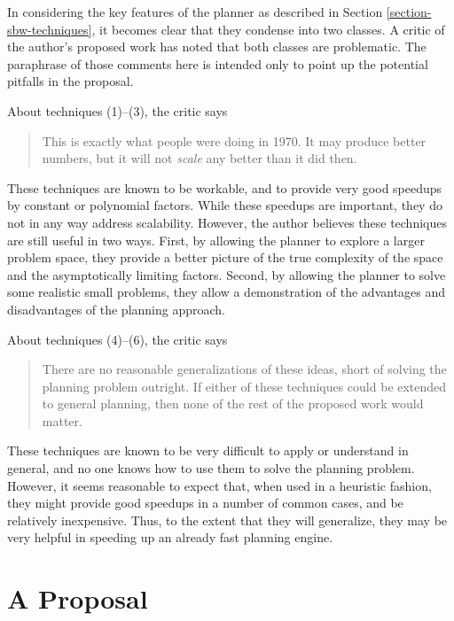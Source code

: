 \documentclass{article}
\begin{document}
In considering the key features of the planner as described in
Section \ref{section-sbw-techniques}, it becomes clear that
they condense into two classes.  A critic of the author's proposed
work has noted that both classes are problematic.  The paraphrase
of those comments here is intended only to point up the potential
pitfalls in the proposal.

About techniques (1)--(3), the critic says
\begin{quote}
This is exactly what people were doing in 1970.  It
may produce better numbers, but it will not {\em scale} any better
than it did then.
\end{quote}
These techniques are known
to be workable, and to provide very good speedups by constant
or polynomial factors.  While these speedups are important,
they do not in any way address scalability.  However, the author
believes these
techniques are still useful in two ways.
First, by allowing the planner to explore a larger
problem space, they provide a better picture of the
true complexity of the space and the asymptotically limiting factors.
Second, by allowing the planner to solve some realistic small problems,
they allow a demonstration of the advantages and disadvantages of the
planning approach.

About techniques (4)--(6), the critic says
\begin{quote}
There are no reasonable generalizations of these ideas,
short of solving the planning problem outright.  If either
of these techniques could be extended to general planning, then
none of the rest of the proposed work would matter.
\end{quote}
These techniques are known to be very difficult to apply or
understand in general, and no one knows how to use them to
solve the planning problem.  However, it seems reasonable to
expect that, when used in a heuristic fashion, they might
provide good speedups in a number of common cases, and be relatively
inexpensive.  Thus, to the extent that they will generalize, they
may be very helpful in speeding up an already fast planning engine.

\section{A Proposal}
\label{section-proposal}
\end{document}

